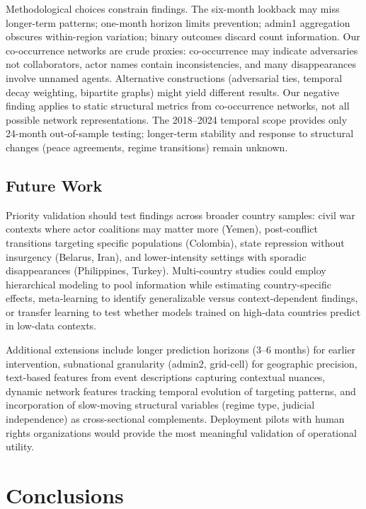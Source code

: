 \documentclass[pdflatex,sn-mathphys-num]{sn-jnl}%
\theoremstyle{thmstyleone}%
\theoremstyle{thmstyletwo}%
\theoremstyle{thmstylethree}%
\begin{document}
Methodological choices constrain findings. The six-month lookback may miss longer-term patterns; one-month horizon limits prevention; admin1 aggregation obscures within-region variation; binary outcomes discard count information. Our co-occurrence networks are crude proxies: co-occurrence may indicate adversaries not collaborators, actor names contain inconsistencies, and many disappearances involve unnamed agents. Alternative constructions (adversarial ties, temporal decay weighting, bipartite graphs) might yield different results. Our negative finding applies to static structural metrics from co-occurrence networks, not all possible network representations. The 2018--2024 temporal scope provides only 24-month out-of-sample testing; longer-term stability and response to structural changes (peace agreements, regime transitions) remain unknown.

\subsection{Future Work}

Priority validation should test findings across broader country samples: civil war contexts where actor coalitions may matter more (Yemen), post-conflict transitions targeting specific populations (Colombia), state repression without insurgency (Belarus, Iran), and lower-intensity settings with sporadic disappearances (Philippines, Turkey). Multi-country studies could employ hierarchical modeling to pool information while estimating country-specific effects, meta-learning to identify generalizable versus context-dependent findings, or transfer learning to test whether models trained on high-data countries predict in low-data contexts.

Additional extensions include longer prediction horizons (3--6 months) for earlier intervention, subnational granularity (admin2, grid-cell) for geographic precision, text-based features from event descriptions capturing contextual nuances, dynamic network features tracking temporal evolution of targeting patterns, and incorporation of slow-moving structural variables (regime type, judicial independence) as cross-sectional complements. Deployment pilots with human rights organizations would provide the most meaningful validation of operational utility.

\section{Conclusions}
\end{document}
